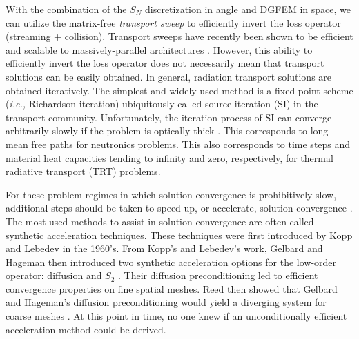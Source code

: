 \documentclass[11pt]{article}
\begin{document}
With the combination of the $S_N$ discretization in angle and DGFEM in space, we can utilize the matrix-free {\em transport sweep} to efficiently invert the loss operator (streaming + collision). Transport sweeps have recently been shown to be efficient and scalable to massively-parallel architectures \cite{ref::eff_sweeps,adams2013provably}. However, this ability to efficiently invert the loss operator does not necessarily mean that transport solutions can be easily obtained. In general, radiation transport solutions are obtained iteratively. The simplest and widely-used method is a fixed-point scheme ({\em i.e.,} Richardson iteration) ubiquitously called source iteration (SI) in the transport community. Unfortunately, the iteration process of SI can converge arbitrarily slowly if the problem is optically thick \cite{ref::adams_larsen_iter_methods}. This corresponds to long mean free paths for neutronics problems. This also corresponds to time steps and material heat capacities tending to infinity and zero, respectively, for thermal radiative transport (TRT) problems.

For these problem regimes in which solution convergence is prohibitively slow, additional steps should be taken to speed up, or accelerate, solution convergence \cite{ref::adams_larsen_iter_methods}. The most used methods to assist in solution convergence are often called synthetic acceleration techniques. These techniques were first introduced by Kopp  \cite{kopp1963synthetic} and Lebedev \cite{lebedevI} in the 1960's. From Kopp's and Lebedev's work, Gelbard and Hageman then introduced two synthetic acceleration options for the low-order operator: diffusion and $S_2$ \cite{gelbard1969synthetic}. Their diffusion preconditioning led to efficient convergence properties on fine spatial meshes. Reed then showed that Gelbard and Hageman's diffusion preconditioning would yield a diverging system for coarse meshes \cite{reed1971effectiveness}. At this point in time, no one knew if an unconditionally efficient acceleration method could be derived.
\end{document}

